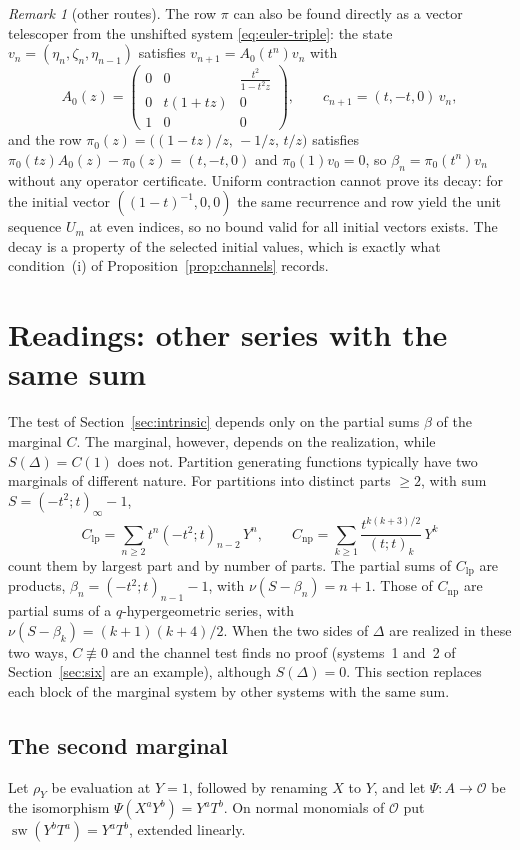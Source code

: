 \documentclass[11pt,a4paper]{article}
\newcommand{\Op}{\mathcal O}
\newcommand{\val}{\nu}
\theoremstyle{plain}
\theoremstyle{definition}
\theoremstyle{remark}
\newtheorem{remark}[theorem]{Remark}
\begin{document}
\begin{remark}[other routes]\label{rem:obstruction}
The row $\pi$ can also be found directly as a vector telescoper from the
unshifted system \eqref{eq:euler-triple}: the state
$v_n=(\eta_n,\zeta_n,\eta_{n-1})$ satisfies $v_{n+1}=A_0(t^n)v_n$ with
\[
  A_0(z)=\begin{pmatrix}0&0&\frac{t^2}{1-t^2z}\\0&t(1+tz)&0\\1&0&0\end{pmatrix},
  \qquad c_{n+1}=(t,-t,0)\,v_n,
\]
and the row $\pi_0(z)=\bigl((1-tz)/z,\,-1/z,\,t/z\bigr)$ satisfies
$\pi_0(tz)A_0(z)-\pi_0(z)=(t,-t,0)$ and $\pi_0(1)v_0=0$, so
$\beta_n=\pi_0(t^n)v_n$ without any operator certificate. Uniform contraction cannot
prove its decay: for the initial vector $((1-t)^{-1},0,0)$ the same
recurrence and row yield the unit sequence $U_m$ at even indices, so no bound valid for all initial vectors exists.
The decay is a property of the selected initial values, which is exactly what
condition~(i) of Proposition~\ref{prop:channels} records.
\end{remark}

\section{Readings: other series with the same sum}\label{sec:readings}

The test of Section~\ref{sec:intrinsic} depends only on the partial sums $\beta$
of the marginal $C$. The marginal, however, depends on the realization, while
$S(\Delta)=C(1)$ does not. Partition generating functions typically have two
marginals of different nature. For partitions into distinct parts $\ge2$, with
sum $S=(-t^2;t)_\infty-1$,
\[
  C_{\mathrm{lp}}=\sum_{n\ge2}t^n(-t^2;t)_{n-2}\,Y^n,\qquad
  C_{\mathrm{np}}=\sum_{k\ge1}\frac{t^{k(k+3)/2}}{(t;t)_k}\,Y^k
\]
count them by largest part and by number of parts. The partial sums of
$C_{\mathrm{lp}}$ are products, $\beta_n=(-t^2;t)_{n-1}-1$, with
$\val(S-\beta_n)=n+1$. Those of $C_{\mathrm{np}}$ are partial sums of a
$q$-hypergeometric series, with $\val(S-\beta_k)=(k+1)(k+4)/2$. When the two
sides of $\Delta$ are realized in these two ways, $C\not\equiv0$ and the channel
test finds no proof (systems~1 and~2 of Section~\ref{sec:six} are an example),
although $S(\Delta)=0$. This section replaces each block of the marginal system
by other systems with the same sum.

\subsection{The second marginal}
Let $\rho_Y$ be evaluation at $Y=1$, followed by renaming $X$ to $Y$, and let
$\Psi:A\to\Op$ be the isomorphism $\Psi(X^aY^b)=Y^aT^b$. On normal monomials of
$\Op$ put $\operatorname{sw}(Y^bT^a)=Y^aT^b$, extended linearly.
\end{document}
